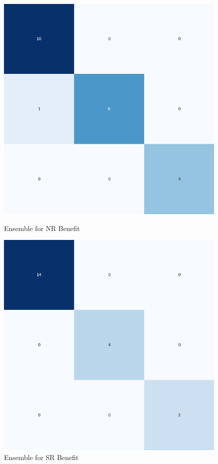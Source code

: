 \begin{figure}[H]
    \centering
    \begin{minipage}[b]{0.45\textwidth}
        \includegraphics[width=\textwidth]{./class_all_section/ensemble_plots/ensemble_confusion_matrix_NR_Benefit.png}
        \caption{Ensemble for NR Benefit}
        \label{fig:ensemble_nr_benefit}
    \end{minipage}
    \hfill
    \begin{minipage}[b]{0.45\textwidth}
        \includegraphics[width=\textwidth]{./class_all_section/ensemble_plots/ensemble_confusion_matrix_SR_Benefit.png}
        \caption{Ensemble for SR Benefit}
        \label{fig:ensemble_sr_benefit}
    \end{minipage}
\end{figure}

